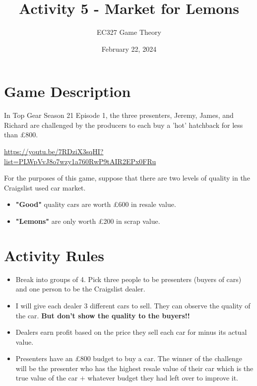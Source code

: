 \documentclass{article}
\title{Activity 5 - Market for Lemons}
\author{EC327 Game Theory}
\date{February 22, 2024}
\begin{document}
    
\maketitle

\section*{Game Description}
In Top Gear Season 21 Episode 1, the three presenters, Jeremy, James, and Richard
are challenged by the producers to each buy a 'hot' hatchback 
for less than \pounds 800.

\url{https://youtu.be/7RDziX3sqHI?list=PLWpVvJ8o7wzy1a760RwP9tAIR2EPx0FRu}

For the purposes of this game, 
suppose that there are two levels of quality in the Craigslist used car market.
\begin{itemize}
  \item \textbf{"Good"} quality cars are worth \pounds 600 in resale value.
  \item \textbf{"Lemons"} are only worth \pounds 200 in scrap value.
\end{itemize}

\section*{Activity Rules}

\begin{itemize}
    \item Break into groups of 4. 
    Pick three people to be presenters (buyers of cars)
    and one person to be the Craigslist dealer.
    
    \item I will give each dealer 3 different cars to sell.
    They can observe the quality of the car. 
    \textbf{But don't show the quality to the buyers!!}

    \item Dealers earn profit based on the price they sell each car for 
    minus its actual value.

    \item Presenters have an \pounds 800 budget to buy a car.
    The winner of the challenge will be the presenter who 
    has the highest resale value of their car 
    which is the true value of the car $+$ whatever budget they had left over to improve it.

\end{itemize}
\end{document}
